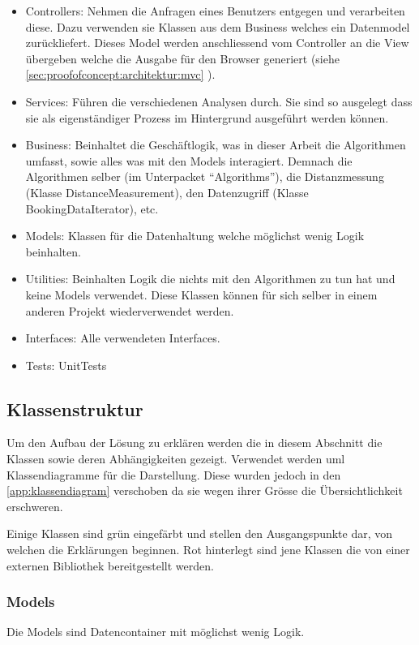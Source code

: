 \begin{itemize}
	\item Controllers: Nehmen die Anfragen eines Benutzers entgegen und verarbeiten diese. Dazu verwenden sie Klassen aus dem Business welches ein Datenmodel zurückliefert. Dieses Model werden anschliessend vom Controller an die View übergeben welche die Ausgabe für den Browser generiert (siehe \cref{sec:proofofconcept:architektur:mvc} ).
	\item Services: Führen die verschiedenen Analysen durch. Sie sind so ausgelegt dass sie als eigenständiger Prozess im Hintergrund ausgeführt werden können.
	\item Business: Beinhaltet die Geschäftlogik, was in dieser Arbeit die Algorithmen umfasst, sowie alles was mit den Models interagiert. Demnach die Algorithmen selber (im Unterpacket "`Algorithms"'), die Distanzmessung (Klasse DistanceMeasurement), den Datenzugriff (Klasse BookingDataIterator), etc.
	\item Models: Klassen für die Datenhaltung welche möglichst wenig Logik beinhalten.
	\item Utilities: Beinhalten Logik die nichts mit den Algorithmen zu tun hat und keine Models verwendet. Diese Klassen können für sich selber in einem anderen Projekt wiederverwendet werden.
	\item Interfaces: Alle verwendeten Interfaces.
	\item Tests: UnitTests
\end{itemize}

\subsection{Klassenstruktur}
\label{sec:proofofconcept:klassenstruktur}
Um den Aufbau der Lösung zu erklären werden die in diesem Abschnitt die Klassen sowie deren Abhängigkeiten gezeigt. Verwendet werden \gls{uml} Klassendiagramme für die Darstellung. Diese wurden jedoch in den \cref{app:klassendiagram} verschoben da sie wegen ihrer Grösse die Übersichtlichkeit erschweren.

Einige Klassen sind grün eingefärbt und stellen den Ausgangspunkte dar, von welchen die Erklärungen beginnen. Rot hinterlegt sind jene Klassen die von einer externen Bibliothek bereitgestellt werden.

\subsubsection{Models}
\label{sec:proofofconcept:klassenstruktur:models}
Die Models sind Datencontainer mit möglichst wenig Logik. 

